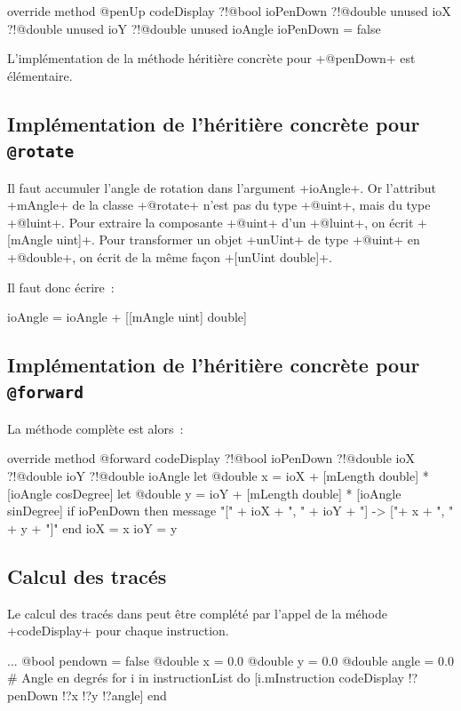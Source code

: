 \begin{galgas}
override method @penUp codeDisplay
  ?!@bool ioPenDown
  ?!@double unused ioX
  ?!@double unused ioY
  ?!@double unused ioAngle
{
  ioPenDown = false
}
\end{galgas}

L'implémentation de la méthode héritière concrète pour \ggs+@penDown+ est élémentaire.

\subsection{Implémentation de l'héritière concrète pour \texttt{@rotate}}
Il faut accumuler l'angle de rotation dans l'argument \ggs+ioAngle+. Or l'attribut \ggs+mAngle+ de la classe \ggs+@rotate+ n'est pas du type \ggs+@uint+, mais du type \ggs+@luint+. Pour extraire la composante \ggs+@uint+ d’un \ggs+@luint+, on écrit \ggs+[mAngle uint]+. Pour transformer un objet \ggs+unUint+ de type \ggs+@uint+ en \ggs+@double+, on écrit de la même façon \ggs+[unUint double]+. 


 Il faut donc écrire~:
\begin{galgas}
ioAngle = ioAngle + [[mAngle uint] double]
\end{galgas}

\subsection{Implémentation de l'héritière concrète pour \texttt{@forward}}
La méthode complète est alors~:

\begin{galgas}
override method @forward codeDisplay
  ?!@bool ioPenDown
  ?!@double ioX
  ?!@double ioY
  ?!@double ioAngle
{
  let @double x = ioX + [mLength double] * [ioAngle cosDegree]
  let @double y = ioY + [mLength double] * [ioAngle sinDegree]
  if ioPenDown then
    message "[" + ioX + ", " + ioY + "] -> ["+ x + ", " + y + "]\n"
  end
  ioX = x
  ioY = y
}
\end{galgas}

\subsection{Calcul des tracés}
Le calcul des tracés dans  peut être complété par l'appel de la méhode \ggs+codeDisplay+ pour chaque instruction.
\begin{galgas}
  ...
  @bool pendown = false
  @double x = 0.0
  @double y = 0.0
  @double angle = 0.0 # Angle en degrés
  for i in instructionList do
    [i.mInstruction codeDisplay !?penDown !?x !?y !?angle]
  end
\end{galgas}

